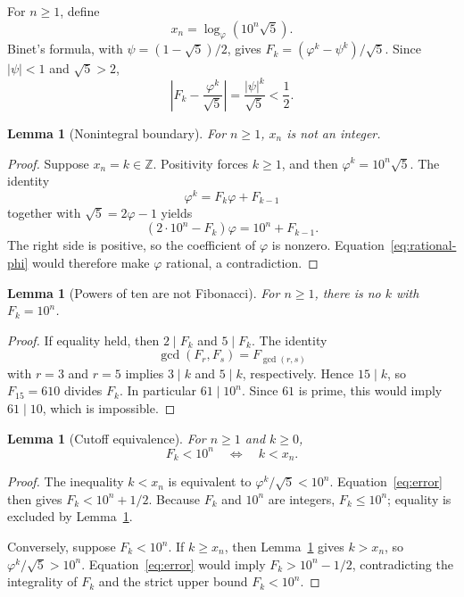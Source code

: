 \documentclass[11pt]{article}
\newtheorem{lemma}[theorem]{Lemma}
\newcommand{\fib}{F}
\begin{document}
For $n\geq 1$, define
\[
 x_n=\log_{\varphi}(10^n\sqrt5).
\]
Binet's formula, with $\psi=(1-\sqrt5)/2$, gives
$\fib_k=(\varphi^k-\psi^k)/\sqrt5$.  Since $|\psi|<1$ and $\sqrt5>2$,
\begin{equation}\label{eq:error}
 \left|\fib_k-\frac{\varphi^k}{\sqrt5}\right|
   =\frac{|\psi|^k}{\sqrt5}<\frac12.
\end{equation}

\begin{lemma}[Nonintegral boundary]\label{lem:nonintegral}
For $n\geq 1$, $x_n$ is not an integer.
\end{lemma}

\begin{proof}
Suppose $x_n=k\in\mathbb Z$.  Positivity forces $k\geq 1$, and then
$\varphi^k=10^n\sqrt5$.  The identity
\[
 \varphi^k=\fib_k\varphi+\fib_{k-1}
\]
together with $\sqrt5=2\varphi-1$ yields
\begin{equation}\label{eq:rational-phi}
 (2\cdot 10^n-\fib_k)\varphi=10^n+\fib_{k-1}.
\end{equation}
The right side is positive, so the coefficient of $\varphi$ is nonzero.
Equation~\eqref{eq:rational-phi} would therefore make $\varphi$ rational, a
contradiction.
\end{proof}

\begin{lemma}[Powers of ten are not Fibonacci]\label{lem:not-power-ten}
For $n\geq 1$, there is no $k$ with $\fib_k=10^n$.
\end{lemma}

\begin{proof}
If equality held, then $2\mid\fib_k$ and $5\mid\fib_k$.  The identity
\[
 \gcd(\fib_r,\fib_s)=\fib_{\gcd(r,s)}
\]
with $r=3$ and $r=5$ implies $3\mid k$ and $5\mid k$, respectively.  Hence
$15\mid k$, so $\fib_{15}=610$ divides $\fib_k$.  In particular
$61\mid 10^n$.  Since $61$ is prime, this would imply $61\mid 10$, which is
impossible.
\end{proof}

\begin{lemma}[Cutoff equivalence]\label{lem:cutoff}
For $n\geq1$ and $k\geq0$,
\[
 \fib_k<10^n \quad\Longleftrightarrow\quad k<x_n.
\]
\end{lemma}

\begin{proof}
The inequality $k<x_n$ is equivalent to
$\varphi^k/\sqrt5<10^n$.  Equation~\eqref{eq:error} then gives
$\fib_k<10^n+1/2$.  Because $\fib_k$ and $10^n$ are integers,
$\fib_k\leq10^n$; equality is excluded by Lemma~\ref{lem:not-power-ten}.

Conversely, suppose $\fib_k<10^n$.  If $k\geq x_n$, then
Lemma~\ref{lem:nonintegral} gives $k>x_n$, so
$\varphi^k/\sqrt5>10^n$.  Equation~\eqref{eq:error} would imply
$\fib_k>10^n-1/2$, contradicting the integrality of $\fib_k$ and the strict
upper bound $\fib_k<10^n$.
\end{proof}
\end{document}
